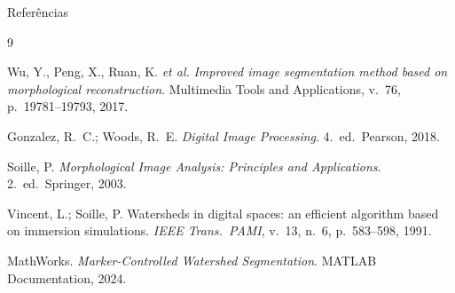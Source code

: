 \documentclass[aspectratio=169,12pt]{beamer}
\begin{document}
\begin{frame}{Refer\^encias}

\begin{thebibliography}{9}
\footnotesize

Wu, Y., Peng, X., Ruan, K. \textit{et al.}
\textit{Improved image segmentation method based on morphological reconstruction}.
Multimedia Tools and Applications, v.\ 76, p.\ 19781--19793, 2017.

Gonzalez, R.\ C.; Woods, R.\ E.
\textit{Digital Image Processing}. 4.\ ed.\ Pearson, 2018.

Soille, P.
\textit{Morphological Image Analysis: Principles and Applications}. 2.\ ed.\ Springer, 2003.

Vincent, L.; Soille, P.
Watersheds in digital spaces: an efficient algorithm based on immersion simulations.
\textit{IEEE Trans.\ PAMI}, v.\ 13, n.\ 6, p.\ 583--598, 1991.

MathWorks.
\textit{Marker-Controlled Watershed Segmentation}.
MATLAB Documentation, 2024.

\end{thebibliography}

\end{frame}
\end{document}
